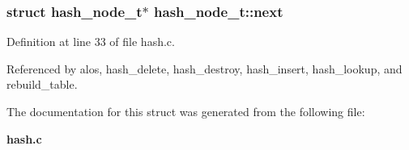 \subsubsection{\setlength{\rightskip}{0pt plus 5cm}struct hash\_\-node\_\-t$\ast$ hash\_\-node\_\-t::next}\label{structhash__node__t_m2}




Definition at line 33 of file hash.c.

Referenced by alos, hash\_\-delete, hash\_\-destroy, hash\_\-insert, hash\_\-lookup, and rebuild\_\-table.

The documentation for this struct was generated from the following file:\begin{CompactItemize}
\item 
{\bf hash.c}\end{CompactItemize}
